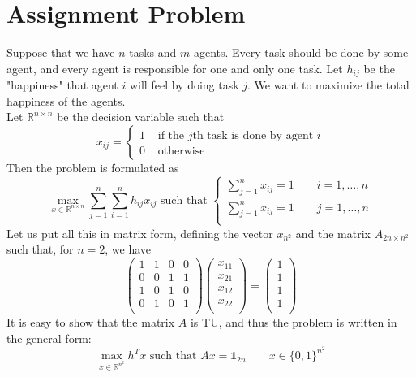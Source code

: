 \documentclass[11pt, openany]{report}
\newcommand{\R}{\mathbb{R}}
\theoremstyle{definition}
\begin{document}
\section{Assignment Problem}
Suppose that we have $n$ tasks and $m$ agents. Every task should be done by some agent, and every agent is responsible for one and only one task. Let $h_{ij}$ be the "happiness" that agent $i$ will feel by doing task $j$. We want to maximize the total happiness of the agents. \\
Let $\R^{n\times n}$ be the decision variable such that 
\begin{equation}
    x_{ij} = \begin{cases}
        1& \text{ if the }j\text{th task is done by agent }i\\
        0& \text{ otherwise}
    \end{cases}
\end{equation}
Then the problem is formulated as 
\begin{equation}
    \max_{x\in \R^{n\times n}} \sum_{j=1}^{n}\sum_{i=1}^n h_{ij}x_{ij}\text{   such that   }\begin{cases}
        \sum_{j=1}^n x_{ij} = 1\qquad i=1, \dots, n\\
        \sum_{j=1}^n x_{ij} = 1\qquad j=1, \dots, n\\
    \end{cases}
\end{equation}
Let us put all this in matrix form, defining the vector $x_{n^2}$ and the matrix $A_{2n\times n^2}$ such that, for \(n=2\), we have
\begin{equation}
    \begin{pmatrix}
        1 & 1 & 0 & 0 \\
        0 & 0 & 1 & 1 \\
        1 & 0 & 1 & 0 \\
        0 & 1 & 0 & 1 \\
    \end{pmatrix}\begin{pmatrix}
        x_{11}\\ x_{21} \\ x_{12} \\ x_{22}\\
    \end{pmatrix} = \begin{pmatrix}
        1\\ 1\\ 1\\ 1\\
    \end{pmatrix}
\end{equation}
It is easy to show that the matrix $A$ is TU, and thus the problem is written in the general form:
\begin{equation}
    \max_{x\in \R^{n^2}} h^Tx \text{   such that   } Ax=\mathbb{1}_{2n}\qquad x\in \{0,1\}^{n^2}
\end{equation}
\end{document}
